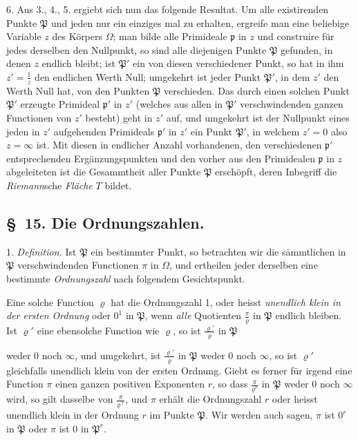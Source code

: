 \documentclass{article}
\begin{document}
6. Aus 3., 4., 5. ergiebt sich nun das folgende Resultat. Um alle existirenden Punkte $\mathfrak{P}$ und jeden nur ein einziges mal zu erhalten, ergreife man eine beliebige Variable $z$ des Körpers $\Omega$; man bilde alle Primideale $\mathfrak{p}$ in $z$ und construire für jedes derselben den Nullpunkt, so sind alle diejenigen Punkte $\mathfrak{P}$ gefunden, in denen $z$ endlich bleibt; ist $\mathfrak{P}'$ ein von diesen verschiedener Punkt, so hat in ihm $z' = \frac{1}{z}$ den endlichen Werth Null; umgekehrt ist jeder Punkt $\mathfrak{P}'$, in dem $z'$ den Werth Null hat, von den Punkten $\mathfrak{P}$ verschieden. Das durch einen solchen Punkt $\mathfrak{P}'$ erzeugte Primideal $\mathfrak{p}'$ in $z'$ (welches aus allen in $\mathfrak{P}'$ verschwindenden ganzen Functionen von $z'$ besteht) geht in $z'$ auf, und umgekehrt ist der Nullpunkt eines jeden in $z'$ aufgehenden Primideals $\mathfrak{p}'$ in $z'$ ein Punkt $\mathfrak{P}'$, in welchem $z' = 0$ also $z = \infty$ ist. Mit diesen in endlicher Anzahl vorhandenen, den verschiedenen $\mathfrak{p}'$ entsprechenden Ergänzungspunkten und den vorher aus den Primidealen $\mathfrak{p}$ in $z$ abgeleiteten ist die Gesammtheit aller Punkte $\mathfrak{P}$ erschöpft, deren Inbegriff die \emph{Riemann}sche \emph{Fläche} $T$ bildet.

\subsection*{§~15. Die Ordnungszahlen.}

1. \emph{Definition.} Ist $\mathfrak{P}$ ein bestimmter Punkt, so betrachten wir die sämmtlichen in $\mathfrak{P}$ verschwindenden Functionen $\pi$ in $\Omega$, und ertheilen jeder derselben eine bestimmte \emph{Ordnungszahl} nach folgendem Gesichtspunkt.

Eine solche Function $\varrho$ hat die Ordnungszahl 1, oder heisst \emph{unendlich klein in der ersten Ordnung} oder $0^{1}$ in $\mathfrak{P}$, wenn \emph{alle} Quotienten $\frac{\pi}{\varrho}$ in $\mathfrak{P}$ endlich bleiben. Ist $\varrho'$ eine ebensolche Function wie $\varrho$, so ist $\frac{\varrho'}{\varrho}$ in $\mathfrak{P}$

weder 0 noch $\infty$, und umgekehrt, ist $\frac{\varrho'}{\varrho}$ in $\mathfrak{P}$ weder 0 noch $\infty$, so ist $\varrho'$ gleichfalls unendlich klein von der ersten Ordnung. Giebt es ferner für irgend eine Function $\pi$ einen ganzen positiven Exponenten $r$, so dass $\frac{\pi}{\varrho^{r}}$ in $\mathfrak{P}$ weder 0 noch $\infty$ wird, so gilt dasselbe von $\frac{\pi}{\varrho^{\prime r}}$, und $\pi$ erhält die Ordnungszahl $r$ oder heisst unendlich klein in der Ordnung $r$ im Punkte $\mathfrak{P}$. Wir werden auch sagen, $\pi$ ist $0^{r}$ in $\mathfrak{P}$ oder $\pi$ ist 0 in $\mathfrak{P}^{r}$.
\end{document}
